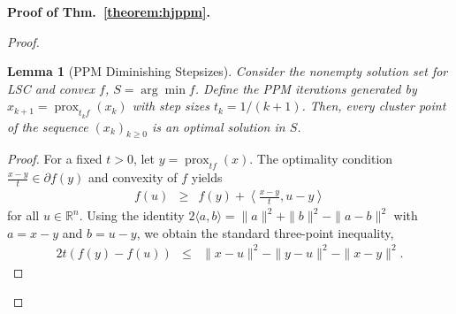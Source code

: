 \documentclass{article}
\newcommand{\prox}{\operatorname{prox}}
\theoremstyle{plain}
\newtheorem{lemma}[theorem]{Lemma}
\theoremstyle{definition}
\theoremstyle{remark}
\begin{document}
\noindent \textbf{Proof of Thm.~\ref{theorem:hjppm}.}
\textit{}
\begin{proof}
\begin{lemma}[PPM Diminishing Stepsizes]\label{lem: ChangingTPPM}
    Consider the nonempty solution set for LSC and convex $f$, $S = \arg\min f$. Define the PPM iterations generated by $x_{k+1} = \prox_{t_k f}(x_k)$ with step sizes $t_k = 1/(k+1)$. Then, every cluster point of the sequence $(x_k)_{k \geq 0}$ is an optimal solution in $S$.
\end{lemma}
\begin{proof}
    For a fixed $t > 0$, let $y = \prox_{tf}(x)$. The optimality condition $\frac{x-y}{t} \in \partial f(y)$ and convexity of $f$ yields
    \begin{eqnarray} \label{eq:subgrad}
        f(u) &\geq& f(y) + \left\langle \frac{x-y}{t}, u-y \right\rangle
    \end{eqnarray}
    for all $u \in \mathbb{R}^n$. Using the identity $2\langle a, b \rangle = \|a\|^2 + \|b\|^2 - \|a-b\|^2$ with $a=x-y$ and $b=u-y$, we obtain the standard three-point inequality,
    \begin{eqnarray} \label{eq:TPI}
        2t(f(y) - f(u)) &\leq& \|x-u\|^2 - \|y-u\|^2 - \|x-y\|^2.
    \end{eqnarray}


\end{proof}
\end{proof}
\end{document}
